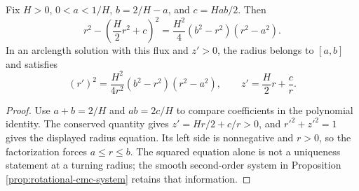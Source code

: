 \begin{lemma}\label{lem:unduloid-radius-factorization}
Fix $H>0$, $0<a<1/H$, $b=2/H-a$, and $c=Hab/2$. Then
\[
 r^2-\left(\frac H2r^2+c\right)^2
 =\frac{H^2}4(b^2-r^2)(r^2-a^2).
\]
In an arclength solution with this flux and $z'>0$, the radius belongs to $[a,b]$ and satisfies
\[
 (r')^2=\frac{H^2}{4r^2}(b^2-r^2)(r^2-a^2),\qquad
 z'=\frac H2r+\frac cr.
\]
\end{lemma}
\begin{proof}
Use $a+b=2/H$ and $ab=2c/H$ to compare coefficients in the polynomial identity. The conserved quantity gives $z'=Hr/2+c/r>0$, and $r'^2+z'^2=1$ gives the displayed radius equation. Its left side is nonnegative and $r>0$, so the factorization forces $a\le r\le b$. The squared equation alone is not a uniqueness statement at a turning radius; the smooth second-order system in Proposition \ref{prop:rotational-cmc-system} retains that information.
\end{proof}
